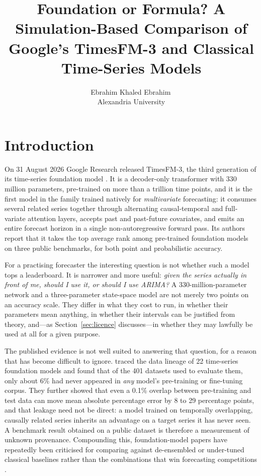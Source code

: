 \documentclass[article]{ajs}
\author{Ebrahim Khaled Ebrahim\,\orcidlink{0009-0006-7839-8778}\\
        Alexandria University}
\title{Foundation or Formula? A Simulation-Based Comparison of Google's TimesFM-3 and
       Classical Time-Series Models}
\providecommand{\sectionref}[1]{Section~\ref{#1}}
\begin{document}
\section{Introduction}

On 31 August 2026 Google Research released TimesFM-3, the third generation of its
time-series foundation model \citep{timesfm3blog}. It is a decoder-only transformer with
330 million parameters, pre-trained on more than a trillion time points, and it is the first
model in the family trained natively for \emph{multivariate} forecasting: it consumes several
related series together through alternating causal-temporal and full-variate attention
layers, accepts past and past-future covariates, and emits an entire forecast horizon in a
single non-autoregressive forward pass. Its authors report that it takes the top average rank
among pre-trained foundation models on three public benchmarks, for both point and
probabilistic accuracy.

For a practising forecaster the interesting question is not whether such a model tops a
leaderboard. It is narrower and more useful: \emph{given the series actually in front of me,
should I use it, or should I use ARIMA?} A 330-million-parameter network and a three-parameter
state-space model are not merely two points on an accuracy scale. They differ in what they
cost to run, in whether their parameters mean anything, in whether their intervals can be
justified from theory, and---as \sectionref{sec:licence} discusses---in whether they may
lawfully be used at all for a given purpose.

The published evidence is not well suited to answering that question, for a reason that has
become difficult to ignore. \citet{meyer2025leakage} traced the data lineage of 22 time-series
foundation models and found that of the 401 datasets used to evaluate them, only about 6\%
had never appeared in \emph{any} model's pre-training or fine-tuning corpus. They further
showed that even a 0.1\% overlap between pre-training and test data can move mean absolute
percentage error by 8 to 29 percentage points, and that leakage need not be direct: a model
trained on temporally overlapping, causally related series inherits an advantage on a target
series it has never seen. A benchmark result obtained on a public dataset is therefore a
measurement of unknown provenance. Compounding this, foundation-model papers have repeatedly
been criticised for comparing against de-ensembled or under-tuned classical baselines rather
than the combinations that win forecasting competitions \citep{makridakis2020m4}.
\end{document}

